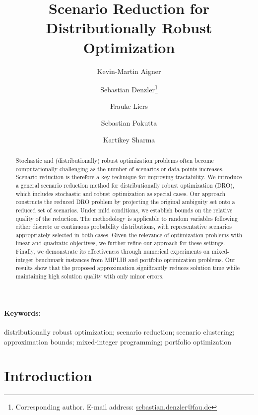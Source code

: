 \documentclass{article}
\title{Scenario Reduction for Distributionally Robust Optimization}
\author[1]{Kevin-Martin Aigner}
\author[1]{Sebastian Denzler\footnote{Corresponding author. E-mail address: \href{mailto:sebastian.denzler@fau.de}{sebastian.denzler@fau.de}}}
\author[1]{Frauke Liers}
\author[2]{Sebastian Pokutta}
\author[3]{Kartikey Sharma}
\affil[1]{Friedrich-Alexander-Universität Erlangen-Nürnberg, Germany}
\affil[2]{Zuse Institute Berlin, Germany}
\affil[3]{Indian Institute of Technology Delhi, India}
\begin{document}
\maketitle

\begin{abstract}
Stochastic and (distributionally) robust optimization problems often become computationally challenging as the number of scenarios or data points increases.
Scenario reduction is therefore a key technique for improving tractability.
We introduce a general scenario reduction method for distributionally robust optimization (DRO), which includes stochastic and robust optimization as special cases.
Our approach constructs the reduced DRO problem by projecting the original ambiguity set onto a reduced set of scenarios.
Under mild conditions, we establish bounds on the relative quality of the reduction.  
The methodology is applicable to random variables following either discrete or continuous probability distributions, with representative scenarios appropriately selected in both cases.
Given the relevance of optimization problems with linear and quadratic objectives, we further refine our approach for these settings.  
Finally, we demonstrate its effectiveness through numerical experiments on mixed-integer benchmark instances from MIPLIB and portfolio optimization problems.  
Our results show that the proposed approximation significantly reduces solution time while maintaining high solution quality with only minor errors.
\end{abstract}
\paragraph{Keywords:} distributionally robust optimization; scenario reduction; scenario clustering; approximation bounds; mixed-integer programming; portfolio optimization

\section{Introduction}
\label{sec:introduction}



\end{document}
